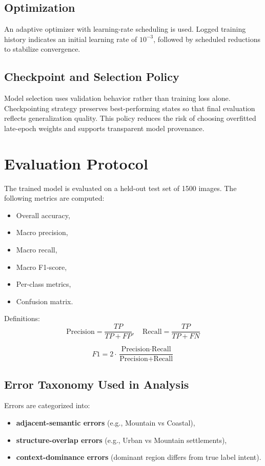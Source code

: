 \subsection{Optimization}
An adaptive optimizer with learning-rate scheduling is used. Logged training history indicates an initial learning rate of $10^{-3}$, followed by scheduled reductions to stabilize convergence.

\subsection{Checkpoint and Selection Policy}
Model selection uses validation behavior rather than training loss alone. Checkpointing strategy preserves best-performing states so that final evaluation reflects generalization quality. This policy reduces the risk of choosing overfitted late-epoch weights and supports transparent model provenance.

\section{Evaluation Protocol}
The trained model is evaluated on a held-out test set of 1500 images. The following metrics are computed:
\begin{itemize}
\item Overall accuracy,
\item Macro precision,
\item Macro recall,
\item Macro F1-score,
\item Per-class metrics,
\item Confusion matrix.
\end{itemize}

Definitions:
\begin{equation}
\text{Precision} = \frac{TP}{TP+FP}, \quad
\text{Recall} = \frac{TP}{TP+FN}
\end{equation}

\begin{equation}
F1 = 2\cdot\frac{\text{Precision}\cdot\text{Recall}}{\text{Precision}+\text{Recall}}
\end{equation}

\subsection{Error Taxonomy Used in Analysis}
Errors are categorized into:
\begin{itemize}
\item \textbf{adjacent-semantic errors} (e.g., Mountain vs Coastal),
\item \textbf{structure-overlap errors} (e.g., Urban vs Mountain settlements),
\item \textbf{context-dominance errors} (dominant region differs from true label intent).
\end{itemize}

